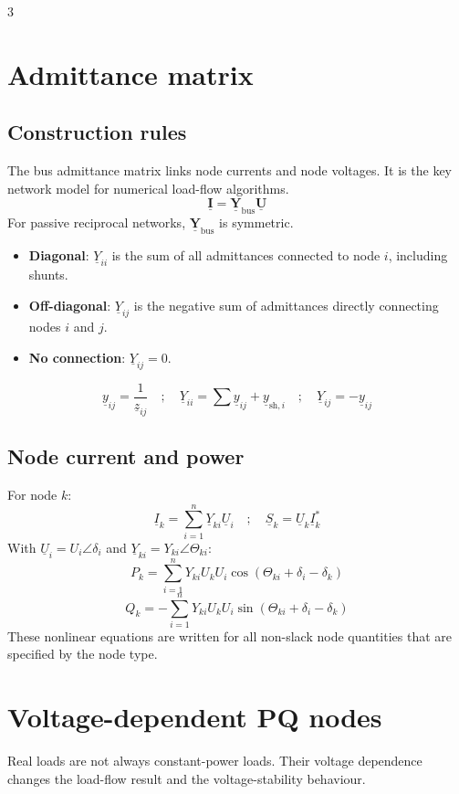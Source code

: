 \documentclass[9pt, landscape, a4paper]{article}
\begin{document}
\begin{multicols*}{3}
\section{Admittance matrix}
\subsection{Construction rules}
The bus admittance matrix links node currents and node voltages. It is the key
network model for numerical load-flow algorithms.
\[
  \underline{\mathbf I}
  =\underline{\mathbf Y}_{\mathrm{bus}}\underline{\mathbf U}
\]
For passive reciprocal networks, $\underline{\mathbf Y}_{\mathrm{bus}}$ is
symmetric.

\begin{itemize}
  \item \textbf{Diagonal}: $\underline Y_{ii}$ is the sum of all admittances
        connected to node $i$, including shunts.
  \item \textbf{Off-diagonal}: $\underline Y_{ij}$ is the negative sum of
        admittances directly connecting nodes $i$ and $j$.
  \item \textbf{No connection}: $\underline Y_{ij}=0$.
\end{itemize}
\[
  \underline y_{ij}=\frac{1}{\underline z_{ij}}
  \quad ; \quad
  \underline Y_{ii}=\sum \underline y_{ij}+\underline y_{\mathrm{sh},i}
  \quad ; \quad
  \underline Y_{ij}=-\underline y_{ij}
\]

\subsection{Node current and power}
For node $k$:
\[
  \underline I_k=\sum_{i=1}^{n}\underline Y_{ki}\underline U_i
  \quad ; \quad
  \underline S_k=\underline U_k\underline I_k^*
\]
With $\underline U_i=U_i\angle\delta_i$ and
$\underline Y_{ki}=Y_{ki}\angle\Theta_{ki}$:
\[
  P_k=\sum_{i=1}^{n}Y_{ki}U_kU_i
  \cos(\Theta_{ki}+\delta_i-\delta_k)
\]
\[
  Q_k=-\sum_{i=1}^{n}Y_{ki}U_kU_i
  \sin(\Theta_{ki}+\delta_i-\delta_k)
\]
These nonlinear equations are written for all non-slack node quantities that
are specified by the node type.

\section{Voltage-dependent PQ nodes}
Real loads are not always constant-power loads. Their voltage dependence
changes the load-flow result and the voltage-stability behaviour.


\end{multicols*}
\end{document}
